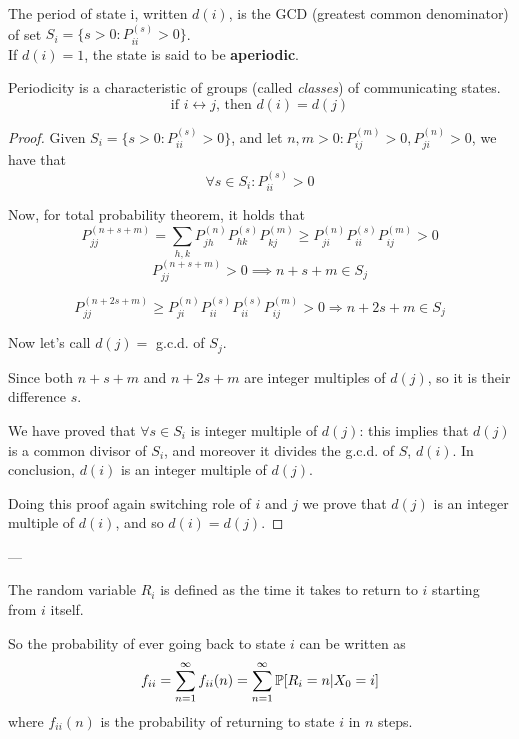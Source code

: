 	\begin{definition}[Periodicity]
		The period of state i, written $d(i)$, is the GCD (greatest common denominator) of set $S_i = \{ s>0 : P_{ii}^{(s)} >0 \}$.\\
		If $d(i)=1$, the state is said to be \textbf{aperiodic}.
	\end{definition}

	\begin{theorem}[Periodicity] Periodicity is a characteristic of groups (called \emph{classes}) of communicating states.
		$$\text{if } i \leftrightarrow j \text{, then } d(i) = d(j)$$
	\end{theorem}

	\begin{proof}
		Given $S_i = \{ s>0 : P_{ii}^{(s)} >0 \}$, and let $n, m > 0 : P_{ij}^{(m)} > 0, P_{ji}^{(n)} > 0$, we have that $$\forall s \in S_i : P_{ii}^{(s)} > 0$$

		Now, for total probability theorem, it holds that
		$$ P_{jj}^{(n+s+m)} = \sum\limits_{h, k} P_{jh}^{(n)} P_{hk}^{(s)} P_{kj}^{(m)} \geq P_{ji}^{(n)} P_{ii}^{(s)} P_{ij}^{(m)} >0 $$
		$$ P_{jj}^{(n+s+m)} >0 \implies n+s+m \in S_j$$

		$$P_{jj}^{(n+2s+m)} \geq P_{ji}^{(n)} P_{ii}^{(s)} P_{ii}^{(s)} P_{ij}^{(m)} >0 \Rightarrow n+2s+m \in S_j$$

		Now let's call $d(j) =$ g.c.d. of $S_j$.

		Since both $n+s+m$ and $n+2s+m$ are integer multiples of $d(j)$, so it is their difference $s$.

		We have proved that $\forall s \in S_i$ is integer multiple of $d(j)$: this implies that $d(j)$ is a common divisor of $S_i$, and moreover it divides the g.c.d. of $S$, $d(i)$. In conclusion, $d(i)$ is an integer multiple of $d(j)$.

		Doing this proof again switching role of $i$ and $j$ we prove that $d(j)$ is an integer multiple of $d(i)$, and so $d(i) = d(j)$.
	\end{proof}
	---

	\begin{definition}
		The random variable $R_i$ is defined as the time it takes to return to $i$ starting from $i$ itself.
	\end{definition}

	So the probability of ever going back to state $i$ can be written as
	$$ f_{ii} = \sum\limits_{n=1}^\infty f_{ii}(n)  = \sum\limits_{n=1}^\infty \mathbb{P}[R_i=n | X_0=i] $$
	where $f_{ii}(n)$ is the probability of returning to state $i$ in $n$ steps.

